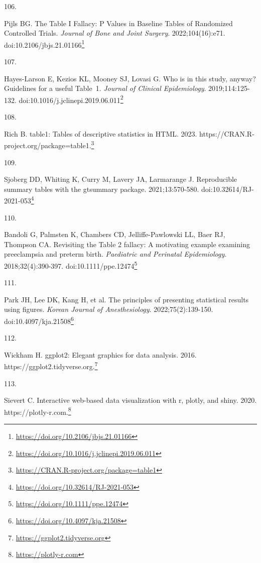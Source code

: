 \documentclass[
  a4paper,
]{book}
\newlength{\cslhangindent}
\newlength{\csllabelwidth}
\newlength{\cslentryspacingunit} %
\newenvironment{CSLReferences}[2] %
 {%
  \setlength{\parindent}{0pt}
  \ifodd #1
  \let\oldpar\par
  \def\par{\hangindent=\cslhangindent\oldpar}
  \fi
  \setlength{\parskip}{#2\cslentryspacingunit}
 }%
 {}
\newcommand{\CSLLeftMargin}[1]{\parbox[t]{\csllabelwidth}{#1}}
\newcommand{\CSLRightInline}[1]{\parbox[t]{\linewidth - \csllabelwidth}{#1}\break}
\renewcommand{\href}[2]{#2\footnote{\url{#1}}}
\begin{document}
\begin{CSLReferences}{0}{0}
\leavevmode{}%
\CSLLeftMargin{106. }%
\CSLRightInline{Pijls BG. The Table I Fallacy: P Values in Baseline Tables of Randomized Controlled Trials. \emph{Journal of Bone and Joint Surgery}. 2022;104(16):e71. doi:\href{https://doi.org/10.2106/jbjs.21.01166}{10.2106/jbjs.21.01166}}

\leavevmode{}%
\CSLLeftMargin{107. }%
\CSLRightInline{Hayes-Larson E, Kezios KL, Mooney SJ, Lovasi G. Who is in this study, anyway? Guidelines for a useful Table~1. \emph{Journal of Clinical Epidemiology}. 2019;114:125-132. doi:\href{https://doi.org/10.1016/j.jclinepi.2019.06.011}{10.1016/j.jclinepi.2019.06.011}}

\leavevmode{}%
\CSLLeftMargin{108. }%
\CSLRightInline{Rich B. table1: Tables of descriptive statistics in HTML. 2023. \href{https://CRAN.R-project.org/package=table1}{https://CRAN.R-project.org/package=table1.}}

\leavevmode{}%
\CSLLeftMargin{109. }%
\CSLRightInline{Sjoberg DD, Whiting K, Curry M, Lavery JA, Larmarange J. Reproducible summary tables with the gtsummary package. 2021;13:570-580. doi:\href{https://doi.org/10.32614/RJ-2021-053}{10.32614/RJ-2021-053}}

\leavevmode{}%
\CSLLeftMargin{110. }%
\CSLRightInline{Bandoli G, Palmsten K, Chambers CD, Jelliffe-Pawlowski LL, Baer RJ, Thompson CA. Revisiting the Table 2 fallacy: A motivating example examining preeclampsia and preterm birth. \emph{Paediatric and Perinatal Epidemiology}. 2018;32(4):390-397. doi:\href{https://doi.org/10.1111/ppe.12474}{10.1111/ppe.12474}}

\leavevmode{}%
\CSLLeftMargin{111. }%
\CSLRightInline{Park JH, Lee DK, Kang H, et al. The principles of presenting statistical results using figures. \emph{Korean Journal of Anesthesiology}. 2022;75(2):139-150. doi:\href{https://doi.org/10.4097/kja.21508}{10.4097/kja.21508}}

\leavevmode{}%
\CSLLeftMargin{112. }%
\CSLRightInline{Wickham H. ggplot2: Elegant graphics for data analysis. 2016. \href{https://ggplot2.tidyverse.org}{https://ggplot2.tidyverse.org.}}

\leavevmode{}%
\CSLLeftMargin{113. }%
\CSLRightInline{Sievert C. Interactive web-based data visualization with r, plotly, and shiny. 2020. \href{https://plotly-r.com}{https://plotly-r.com.}}


\end{CSLReferences}
\end{document}
